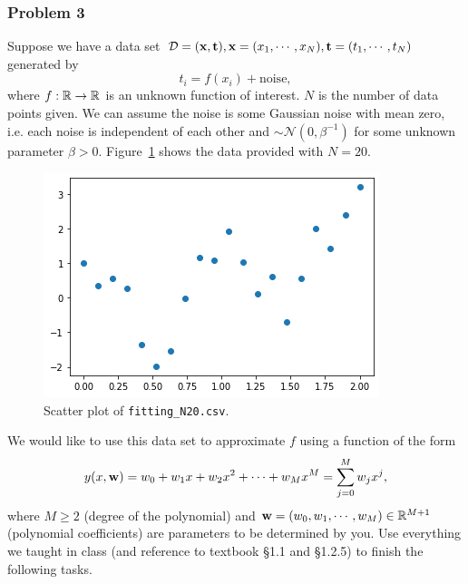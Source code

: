 \documentclass[12pt,a4paper]{article}
\renewcommand{\v}[1]{\ifmmode\mathbf{#1}\fi}
\newcommand{\ra}[1]{\ifnum #1=1\rightarrow\fi\ifnum #1=2\Rightarrow\fi\ifnum #1=3\Rrightarrow\fi\ifnum #1=4\rightrightarrows\fi\ifnum #1=5\rightleftarrows\fi\ifnum #1=6\mapsto\fi\ifnum #1=7\fi\ifnum #1=8\twoheadrightarrow\fi\ifnum #1=9\rightharpoonup\fi\ifnum #1=0\rightharpoondown\fi}
\newcommand{\R}{\ifmmode\mathbb R\fi}
\begin{document}
\subsubsection*{Problem 3}
Suppose we have a data set $\mathcal D = (\v x, \v t), \v x= (x_1, \cdots, x_N), \v t = (t_1, \cdots, t_N)$ generated by
\begin{equation*}
t_i = f(x_i) + \mbox{noise},
\end{equation*}
where $f: \R \ra1 \R$ is an unknown function of interest. $N$ is the number of data points given. We can assume the noise is some Gaussian noise with mean zero, i.e. each noise is independent of each other and $\sim \mathcal N(0, \beta^{-1})$ for some unknown parameter $\beta>0$. Figure~\ref{fig:N20} shows the data provided with $N=20$.
%
\begin{figure}[h]
\centering
\includegraphics[scale=0.6]{TP1_fitting_N20}
\caption{Scatter plot of \texttt{fitting\_N20.csv}.}
\label{fig:N20}
\end{figure}
%
We would like to use this data set to approximate $f$ using a function of the form
%
\begin{equation*} 
y(x,\v{w})=w_0+w_1x+w_2x^2+\cdots+w_Mx^M=\sum_{j=0}^M w_j x^j, 
\end{equation*}
%
where $M \geq 2$ (degree of the polynomial) and $\v w = (w_0, w_1, \cdots, w_M) \in \R^{M+1}$ (polynomial coefficients) are parameters to be determined by you. Use everything we taught in class (and reference to textbook \S1.1 and \S1.2.5) to finish the following tasks. 
%
\end{document}

